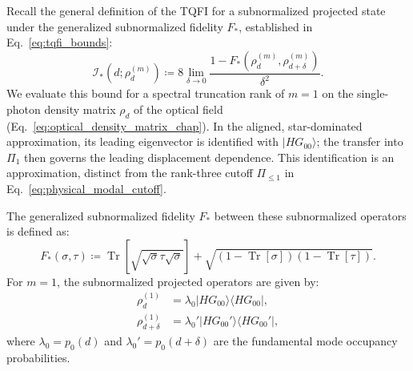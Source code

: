 Recall the general definition of the TQFI for a subnormalized projected state under the generalized subnormalized fidelity $F_*$, established in Eq.~\eqref{eq:tqfi_bounds}:
\begin{equation}
    \mathcal{I}_*\left(d; \rho^{(m)}_d\right) \coloneqq 8 \lim_{\delta \to 0} \frac{1 - F_*\left(\rho^{(m)}_d, \rho^{(m)}_{d+\delta}\right)}{\delta^2}.
    \label{eq:tqfi_general_def}
\end{equation}
We evaluate this bound for a spectral truncation rank of $m=1$ on the single-photon density matrix $\rho_d$ of the optical field (Eq.~\eqref{eq:optical_density_matrix_chap}). In the aligned, star-dominated approximation, its leading eigenvector is identified with $|HG_{00}\rangle$; the transfer into $\Pi_1$ then governs the leading displacement dependence. This identification is an approximation, distinct from the rank-three cutoff $\Pi_{\leq1}$ in Eq.~\eqref{eq:physical_modal_cutoff}.

The generalized subnormalized fidelity $F_*$ between these subnormalized operators is defined as:
\begin{equation}
    F_*(\sigma, \tau) \coloneqq \operatorname{Tr}\left[\sqrt{\sqrt{\sigma}\tau\sqrt{\sigma}}\right] + \sqrt{(1 - \operatorname{Tr}[\sigma])(1 - \operatorname{Tr}[\tau])}.
    \label{eq:f_star_definition}
\end{equation}
For $m=1$, the subnormalized projected operators are given by:
\begin{align}
    \rho_d^{(1)}          & = \lambda_0 |HG_{00}\rangle\langle HG_{00}|,    \\
    \rho_{d+\delta}^{(1)} & = \lambda_0' |HG_{00}'\rangle\langle HG_{00}'|,
\end{align}
where $\lambda_0 = p_0(d)$ and $\lambda_0' = p_0(d+\delta)$ are the fundamental mode occupancy probabilities.

